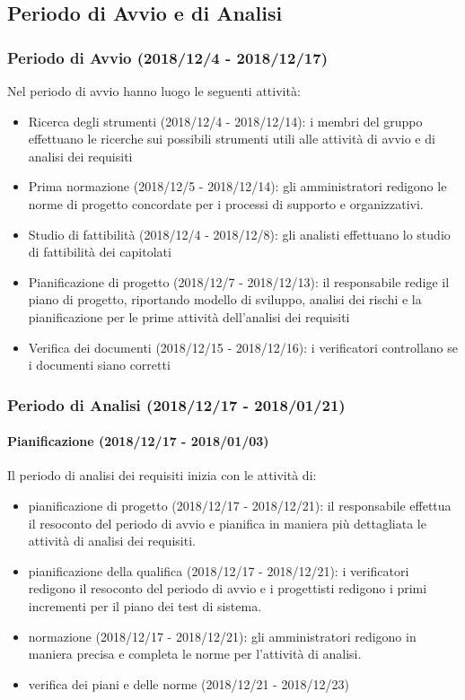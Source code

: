 \subsection{Periodo di Avvio e di Analisi }
	\subsubsection{Periodo di Avvio (2018/12/4 - 2018/12/17)}
		Nel periodo di avvio hanno luogo le seguenti attività:
		\begin{itemize}
			\item Ricerca degli strumenti (2018/12/4 - 2018/12/14): i membri del gruppo effettuano le ricerche sui possibili strumenti utili alle attività di avvio e di analisi dei requisiti
			\item Prima normazione (2018/12/5 - 2018/12/14): gli amministratori redigono le norme di progetto concordate per i processi di supporto e organizzativi.
			\item Studio di fattibilità (2018/12/4 - 2018/12/8): gli analisti effettuano lo studio di fattibilità dei capitolati
			\item Pianificazione di progetto (2018/12/7 - 2018/12/13): il responsabile redige il piano di progetto, riportando modello di sviluppo, analisi dei rischi e la pianificazione per le prime attività dell'analisi dei requisiti
			\item Verifica dei documenti (2018/12/15 - 2018/12/16): i verificatori controllano se i documenti siano corretti
		\end{itemize}
		
	\subsubsection{Periodo di Analisi (2018/12/17 - 2018/01/21)}	
		\paragraph{Pianificazione (2018/12/17 - 2018/01/03)} Il periodo di analisi dei requisiti inizia con le attività di:
			\begin{itemize}
				\item pianificazione di progetto (2018/12/17 - 2018/12/21): il responsabile effettua il resoconto del periodo di avvio e pianifica in maniera più dettagliata le attività di analisi dei requisiti. 
				\item pianificazione della qualifica (2018/12/17 - 2018/12/21): i verificatori redigono il resoconto del periodo di avvio e i progettisti redigono i primi incrementi per il piano dei test di sistema. 
				\item normazione (2018/12/17 - 2018/12/21): gli amministratori redigono in maniera precisa e completa le norme per l'attività di analisi. 
				\item verifica dei piani e delle norme (2018/12/21 - 2018/12/23)
			\end{itemize}
		
